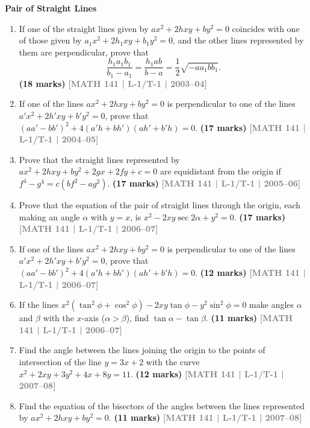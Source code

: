 \documentclass[12pt,a4paper]{article}
\newcommand{\yr}[1]{\hfill\textcolor{gray}{\small\textbf{[#1]}}}
\newcommand{\mk}[1]{\textcolor{orange!70!black}{\small\textbf{(#1 marks)}}}
\newcommand{\subtopic}[2]{%
  \vspace{10pt}
  \noindent\begin{tcolorbox}[colback=#1!8,colframe=#1,boxrule=0.6pt,arc=4pt,
    left=6pt,right=6pt,top=4pt,bottom=4pt]
    \small\bfseries\textcolor{#1}{#2}
  \end{tcolorbox}
  \vspace{2pt}
}
\begin{document}
\subtopic{cH}{Pair of Straight Lines}
\label{sub:s10-pairlines}

\begin{enumerate}

\item If one of the straight lines given by $ax^{2}+2hxy+by^{2}=0$ coincides with one of those given by $a_{1}x^{2}+2h_{1}xy+b_{1}y^{2}=0$, and the other lines represented by them are perpendicular, prove that
\[
\frac{h_{1}a_{1}b_{1}}{b_{1}-a_{1}}=\frac{h_{1}ab}{b-a}=\frac{1}{2}\sqrt{-aa_{1}bb_{1}}.
\]
\mk{18} \yr{MATH 141 | L-1/T-1 | 2003--04}




\item If one of the lines $ax^{2}+2hxy+by^{2}=0$ is perpendicular to one of the lines $a'x^{2}+2h'xy+b'y^{2}=0$, prove that $(aa'-bb')^{2}+4(a'h+bh')(ah'+b'h)=0$.
\mk{17} \yr{MATH 141 | L-1/T-1 | 2004--05}

\item Prove that the straight lines represented by $ax^{2}+2hxy+by^{2}+2gx+2fy+c=0$ are equidistant from the origin if $f^{4}-g^{4}=c(bf^{2}-ag^{2})$.
\mk{17} \yr{MATH 141 | L-1/T-1 | 2005--06}

\item Prove that the equation of the pair of straight lines through the origin, each making an angle $\alpha$ with $y=x$, is $x^{2}-2xy\sec 2\alpha+y^{2}=0$.
\mk{17} \yr{MATH 141 | L-1/T-1 | 2006--07}

\item If one of the lines $ax^{2}+2hxy+by^{2}=0$ is perpendicular to one of the lines $a'x^{2}+2h'xy+b'y^{2}=0$, prove that $(aa'-bb')^{2}+4(a'h+bh')(ah'+b'h)=0$.
\mk{12} \yr{MATH 141 | L-1/T-1 | 2006--07}

\item If the lines $x^{2}(\tan^{2}\phi+\cos^{2}\phi)-2xy\tan\phi-y^{2}\sin^{2}\phi=0$ make angles $\alpha$ and $\beta$ with the $x$-axis ($\alpha>\beta$), find $\tan\alpha-\tan\beta$.
\mk{11} \yr{MATH 141 | L-1/T-1 | 2006--07}

\item Find the angle between the lines joining the origin to the points of intersection of the line $y=3x+2$ with the curve $x^{2}+2xy+3y^{2}+4x+8y=11$.
\mk{12} \yr{MATH 141 | L-1/T-1 | 2007--08}

\item Find the equation of the bisectors of the angles between the lines represented by $ax^{2}+2hxy+by^{2}=0$.
\mk{11} \yr{MATH 141 | L-1/T-1 | 2007--08}


\end{enumerate}
\end{document}
